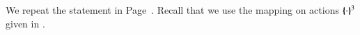 
%

We repeat the statement in Page~\pageref{prop:op_corr_HOpp_to_HOp}.
Recall that we use the mapping on actions $\{\!\!\{\cdot\}\!\!\}^{3}$ given in .

\begin{proposition}\myrm
	\label{app:prop:op_corr_HOpp_to_HOp}
	
\end{proposition}

